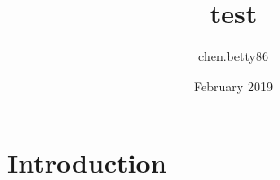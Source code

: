 \documentclass{article}
\title{test}
\author{chen.betty86 }
\date{February 2019}
\begin{document}
\maketitle

\section{Introduction}
\end{document}
